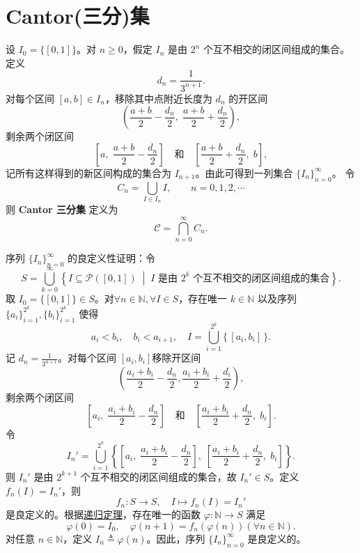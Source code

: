 \documentclass[../../main.tex]{subfiles}%
\begin{document}
\section{Cantor(三分)集}

\begin{definition}[Cantor三分集]\label{definition:Cantor三分集}
设 \( I_0 = \{[0,1]\} \)。对 \( n \geqslant 0 \)，假定 \( I_n \) 是由 \( 2^n \) 个互不相交的闭区间组成的集合。定义
\[
d_n = \frac{1}{3^{n+1}}.
\]
对每个区间 \([a,b] \in I_n\)，移除其中点附近长度为 \( d_n \) 的开区间
\[
\left( \frac{a+b}{2} - \frac{d_n}{2},\; \frac{a+b}{2} + \frac{d_n}{2} \right),
\]
剩余两个闭区间
\[
\left[ a,\; \frac{a+b}{2} - \frac{d_n}{2} \right] \quad\text{和}\quad \left[ \frac{a+b}{2} + \frac{d_n}{2},\; b \right],
\]
记所有这样得到的新区间构成的集合为 \( I_{n+1} \)。由此可得到一列集合 \(\{I_n\}_{n=0}^{\infty}\)。
令
\[
C_n = \bigcup_{I \in I_n} I, \qquad n = 0,1,2,\cdots
\]
则 \textbf{Cantor 三分集} 定义为
\[
\mathcal{C} = \bigcap_{n=0}^{\infty} C_n.
\]
\end{definition}
\begin{remark}
序列 \(\{I_n\}_{n=0}^{\infty}\) 的良定义性证明：令
\[
S = \bigcup_{k=0}^{\infty} \left\{ I \subseteq \mathcal{P}([0,1]) \;\middle|\; I \text{ 是由 } 2^k \text{ 个互不相交的闭区间组成的集合} \right\}.
\]
取 \( I_0 = \{[0,1]\} \in S \)。对\(\forall n \in \mathbb{N},\forall I \in S \)，存在唯一 \( k \in \mathbb{N} \) 以及序列 \(\{a_i\}_{i=1}^{2^k},\{b_i\}_{i=1}^{2^k}\) 使得
\[
a_i < b_i,\quad b_i < a_{i+1},\quad I = \bigcup_{i=1}^{2^k} \{\,[a_i,b_i]\,\}.
\]
记 \( d_n = \frac{1}{3^{n+1}} \)。对每个区间 \([a_i, b_i]\)移除开区间
\[
\left( \frac{a_i+b_i}{2}-\frac{d_n}{2},\frac{a_i+b_i}{2}+\frac{d_i}{2} \right) ,
\]
剩余两个闭区间
\[
\left[ a_i,\;\frac{a_i+b_i}{2}-\frac{d_n}{2} \right] \quad \text{和}\quad \left[ \frac{a_i+b_i}{2}+\frac{d_n}{2},\;b_i \right] .
\]
令
\[
I_n' =\bigcup_{i=1}^{2^k}{\left\{ \left[ a_i,\;\frac{a_i+b_i}{2}-\frac{d_n}{2} \right] ,\;\left[ \frac{a_i+b_i}{2}+\frac{d_n}{2},\;b_i \right] \right\}}.
\]
则 \( I_n' \) 是由 \( 2^{k+1} \) 个互不相交的闭区间组成的集合，故 \( I_n' \in S \)。定义 \( f_n(I) = I_n' \)，则
\[
f_n : S \to S,\quad I \mapsto f_n(I) = I_n'
\]
是良定义的。根据\hyperref[Set Theory-theorem:递归定理]{递归定理}，存在唯一的函数 \( \varphi : \mathbb{N} \to S \) 满足
\[
\varphi(0) = I_0,\quad \varphi(n+1) = f_n(\varphi(n))(\forall n \in \mathbb{N}).
\]
对任意 \( n \in \mathbb{N} \)，定义 \( I_n \triangleq \varphi(n) \)。因此，序列 \(\{I_n\}_{n=0}^{\infty}\) 是良定义的。
\end{remark}
\end{document}
